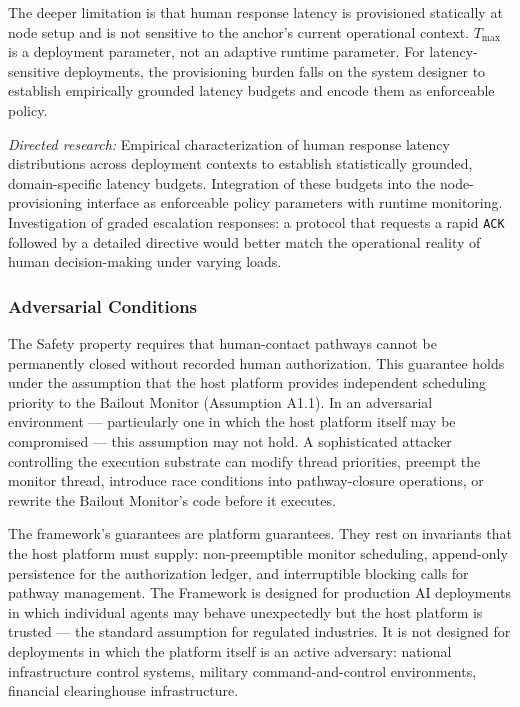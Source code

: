 The deeper limitation is that human response latency is provisioned statically
at node setup and is not sensitive to the anchor's current operational context.
$T_{\max}$ is a deployment parameter, not an adaptive runtime parameter.  For
latency-sensitive deployments, the provisioning burden falls on the system
designer to establish empirically grounded latency budgets and encode them as
enforceable policy.

\textit{Directed research:} Empirical characterization of human response
latency distributions across deployment contexts to establish statistically
grounded, domain-specific latency budgets.  Integration of these budgets into
the node-provisioning interface as enforceable policy parameters with runtime
monitoring.  Investigation of graded escalation responses: a protocol that
requests a rapid \texttt{ACK} followed by a detailed directive would better
match the operational reality of human decision-making under varying loads.

\subsubsection{Adversarial Conditions}\label{sec:adversarial-conditions}

The Safety property requires that human-contact pathways cannot be permanently
closed without recorded human authorization.  This guarantee holds under the
assumption that the host platform provides independent scheduling priority to
the Bailout Monitor (Assumption A1.1).  In an adversarial environment ---
particularly one in which the host platform itself may be compromised --- this
assumption may not hold.  A sophisticated attacker controlling the execution
substrate can modify thread priorities, preempt the monitor thread, introduce
race conditions into pathway-closure operations, or rewrite the Bailout
Monitor's code before it executes.

The framework's guarantees are platform guarantees.  They rest on invariants
that the host platform must supply: non-preemptible monitor scheduling,
append-only persistence for the authorization ledger, and interruptible
blocking calls for pathway management.  The \bxthree{} Framework is designed
for production AI deployments in which individual agents may behave
unexpectedly but the host platform is trusted --- the standard assumption for
regulated industries.  It is not designed for deployments in which the platform
itself is an active adversary: national infrastructure control systems,
military command-and-control environments, financial clearinghouse
infrastructure.

